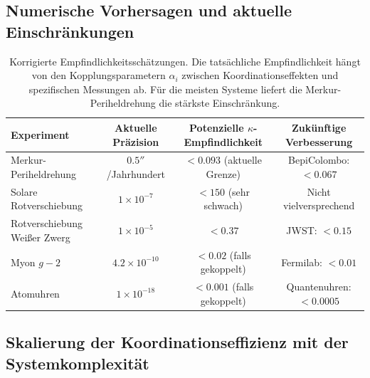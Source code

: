 \documentclass[11pt,a4paper]{article}
\begin{document}
	\subsection{Numerische Vorhersagen und aktuelle Einschränkungen}
	
	\begin{table}[htbp]
		\centering
		\small
		\begin{tabular}{lccc}
			\toprule
			\textbf{Experiment} & \textbf{Aktuelle Präzision} & \textbf{Potenzielle $\kappa$-Empfindlichkeit} & \textbf{Zukünftige Verbesserung} \\
			\midrule
			Merkur-Periheldrehung & $0.5''$/Jahrhundert & $<0.093$ (aktuelle Grenze) & BepiColombo: $<0.067$ \\
			Solare Rotverschiebung & $1\times10^{-7}$ & $<150$ (sehr schwach) & Nicht vielversprechend \\
			Rotverschiebung Weißer Zwerg & $1\times10^{-5}$ & $<0.37$ & JWST: $<0.15$ \\
			Myon $g-2$ & $4.2\times10^{-10}$ & $<0.02$ (falls gekoppelt) & Fermilab: $<0.01$ \\
			Atomuhren & $1\times10^{-18}$ & $<0.001$ (falls gekoppelt) & Quantenuhren: $<0.0005$ \\
			\bottomrule
		\end{tabular}
		\caption{Korrigierte Empfindlichkeitsschätzungen. Die tatsächliche Empfindlichkeit hängt von den Kopplungsparametern $\alpha_i$ zwischen Koordinationseffekten und spezifischen Messungen ab. Für die meisten Systeme liefert die Merkur-Periheldrehung die stärkste Einschränkung.}
	\end{table}
	
	\subsection{Skalierung der Koordinationseffizienz mit der Systemkomplexität}
	
\end{document}
